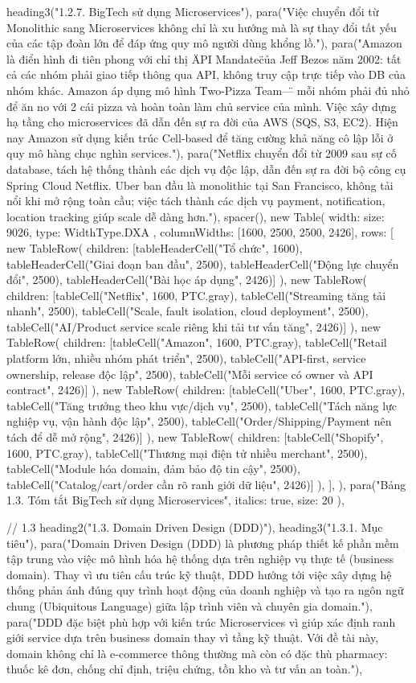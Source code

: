  heading3("1.2.7. BigTech sử dụng Microservices"),
  para("Việc chuyển đổi từ Monolithic sang Microservices không chỉ là xu hướng mà là sự thay đổi tất yếu của các tập đoàn lớn để đáp ứng quy mô người dùng khổng lồ."),
  para("Amazon là điển hình đi tiên phong với chỉ thị \"API Mandate\" của Jeff Bezos năm 2002: tất cả các nhóm phải giao tiếp thông qua API, không truy cập trực tiếp vào DB của nhóm khác. Amazon áp dụng mô hình \"Two-Pizza Team\" — mỗi nhóm phải đủ nhỏ để ăn no với 2 cái pizza và hoàn toàn làm chủ service của mình. Việc xây dựng hạ tầng cho microservices đã dẫn đến sự ra đời của AWS (SQS, S3, EC2). Hiện nay Amazon sử dụng kiến trúc Cell-based để tăng cường khả năng cô lập lỗi ở quy mô hàng chục nghìn services."),
  para("Netflix chuyển đổi từ 2009 sau sự cố database, tách hệ thống thành các dịch vụ độc lập, dẫn đến sự ra đời bộ công cụ Spring Cloud Netflix. Uber ban đầu là monolithic tại San Francisco, không tải nổi khi mở rộng toàn cầu; việc tách thành các dịch vụ payment, notification, location tracking giúp scale dễ dàng hơn."),
  spacer(),
  new Table({
    width: { size: 9026, type: WidthType.DXA },
    columnWidths: [1600, 2500, 2500, 2426],
    rows: [
      new TableRow({ children: [tableHeaderCell("Tổ chức", 1600), tableHeaderCell("Giai đoạn ban đầu", 2500), tableHeaderCell("Động lực chuyển đổi", 2500), tableHeaderCell("Bài học áp dụng", 2426)] }),
      new TableRow({ children: [tableCell("Netflix", 1600, PTC.gray), tableCell("Streaming tăng tải nhanh", 2500), tableCell("Scale, fault isolation, cloud deployment", 2500), tableCell("AI/Product service scale riêng khi tải tư vấn tăng", 2426)] }),
      new TableRow({ children: [tableCell("Amazon", 1600, PTC.gray), tableCell("Retail platform lớn, nhiều nhóm phát triển", 2500), tableCell("API-first, service ownership, release độc lập", 2500), tableCell("Mỗi service có owner và API contract", 2426)] }),
      new TableRow({ children: [tableCell("Uber", 1600, PTC.gray), tableCell("Tăng trưởng theo khu vực/dịch vụ", 2500), tableCell("Tách năng lực nghiệp vụ, vận hành độc lập", 2500), tableCell("Order/Shipping/Payment nên tách để dễ mở rộng", 2426)] }),
      new TableRow({ children: [tableCell("Shopify", 1600, PTC.gray), tableCell("Thương mại điện tử nhiều merchant", 2500), tableCell("Module hóa domain, đảm bảo độ tin cậy", 2500), tableCell("Catalog/cart/order cần rõ ranh giới dữ liệu", 2426)] }),
    ],
  }),
  para("Bảng 1.3. Tóm tắt BigTech sử dụng Microservices", { italics: true, size: 20 }),

  // 1.3
  heading2("1.3. Domain Driven Design (DDD)"),
  heading3("1.3.1. Mục tiêu"),
  para("Domain Driven Design (DDD) là phương pháp thiết kế phần mềm tập trung vào việc mô hình hóa hệ thống dựa trên nghiệp vụ thực tế (business domain). Thay vì ưu tiên cấu trúc kỹ thuật, DDD hướng tới việc xây dựng hệ thống phản ánh đúng quy trình hoạt động của doanh nghiệp và tạo ra ngôn ngữ chung (Ubiquitous Language) giữa lập trình viên và chuyên gia domain."),
  para("DDD đặc biệt phù hợp với kiến trúc Microservices vì giúp xác định ranh giới service dựa trên business domain thay vì tầng kỹ thuật. Với đề tài này, domain không chỉ là e-commerce thông thường mà còn có đặc thù pharmacy: thuốc kê đơn, chống chỉ định, triệu chứng, tồn kho và tư vấn an toàn."),

